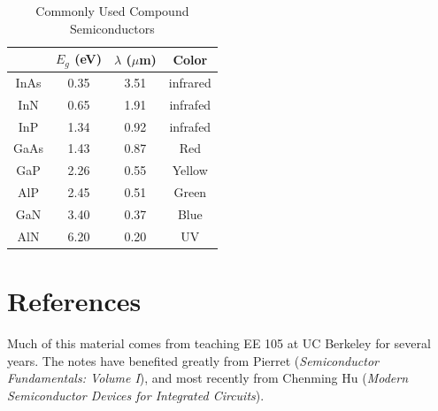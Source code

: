     \begin{table}[htbp]
    \begin{center}
      \caption{Commonly Used Compound Semiconductors}
        \begin{tabular}{cccc}
        \toprule
        & $E_g$ (eV) & $\lambda$ ($\mu$m) & \textbf{Color} \\
        \midrule
        \rowcolor[rgb]{ .851,  .851,  .851} InAs  & 0.35  & 3.51  & infrared \\
        InN   & 0.65  & 1.91  & infrafed \\
        \rowcolor[rgb]{ .851,  .851,  .851} InP   & 1.34  & 0.92  & infrafed \\
        GaAs  & 1.43  & 0.87  & Red \\
        \rowcolor[rgb]{ .851,  .851,  .851} GaP   & 2.26  & 0.55  & Yellow \\
        AlP   & 2.45  & 0.51  & Green \\
        \rowcolor[rgb]{ .851,  .851,  .851} GaN   & 3.40  & 0.37  & Blue \\
        AlN   & 6.20  & 0.20  & UV \\
        \bottomrule
        \end{tabular}
      \label{tab:rainbow}
    \end{center}
    \end{table}
\section{References}
Much of this material comes from teaching EE 105 at UC Berkeley for several years.  The notes have benefited greatly from Pierret (\emph{Semiconductor Fundamentals: Volume I}), and most recently from Chenming Hu (\emph{Modern Semiconductor Devices for Integrated Circuits}).
